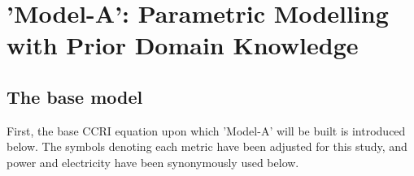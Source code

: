     
    

\section{'Model-A': Parametric Modelling with Prior Domain Knowledge}



\subsection{The base model}

First, the base CCRI equation \cite{CryptoCarbonRatingsInstitute2022TheNetwork} upon which 'Model-A' will be built is introduced below. The symbols denoting each metric have been adjusted for this study, and power and electricity have been synonymously used below. 

